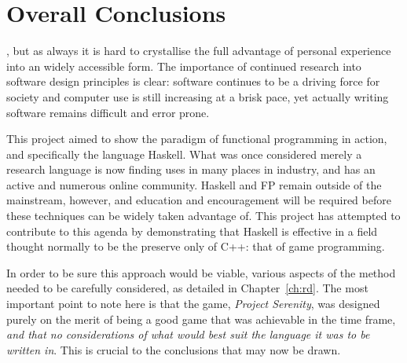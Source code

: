 \chapter[Overall Conclusions]{Overall Conclusions}
\label{ch:conclusions}


, but as always it is hard to crystallise the full advantage of personal experience into an widely accessible form. The importance of continued research into software design principles is clear: software continues to be a driving force for society and computer use is still increasing at a brisk pace,\cite{borodovsky2006marching} yet actually writing software remains difficult and error prone.\cite[1em]{paulk1993capability} 

This project aimed to show the paradigm of functional programming in action, and specifically the language Haskell. What was once considered merely a research language is now finding uses in many places in industry, and has an active and numerous online community. Haskell and FP remain outside of the mainstream, however, and education and encouragement will be required before these techniques can be widely taken advantage of. This project has attempted to contribute to this agenda by demonstrating that Haskell is effective in a field thought normally to be the preserve only of C++: that of game programming. 

In order to be sure this approach would be viable, various aspects of the method needed to be carefully considered, as detailed in Chapter~\ref{ch:rd}. The most important point to note here is that the game, \emph{Project Serenity}, was designed purely on the merit of being a good game that was achievable in the time frame, \emph{and that no considerations of what would best suit the language it was to be written in}. This is crucial to the conclusions that may now be drawn.

